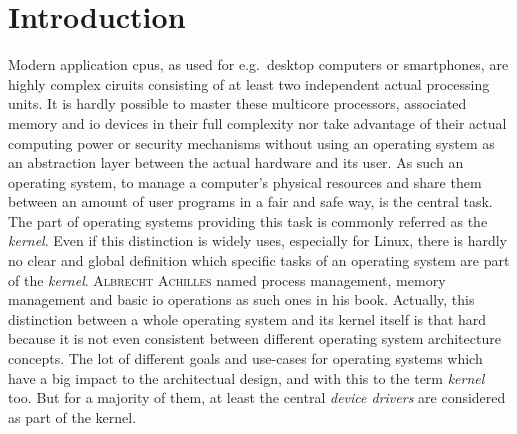 

\chapter{Introduction}\label{ch:introduction}



Modern application \acp{cpu}, as used for e.g.\ desktop computers or smartphones, are highly complex ciruits consisting of at least two independent actual processing units.
It is hardly possible to master these multicore processors, associated memory and \ac{io} devices in their full complexity nor take advantage of their actual computing power or security mechanisms without using an operating system as an abstraction layer between the actual hardware and its user.
As such an operating system, to manage a computer's physical resources and share them between an amount of user programs in a fair and safe way, is the central task.
The part of operating systems providing this task is commonly referred as the \textit{kernel}.  
Even if this distinction is widely uses, especially for Linux, there is hardly no clear and global definition which specific tasks of an operating system are part of the \textit{kernel}.
\textsc{Albrecht Achilles} named process management, memory management and basic \ac{io} operations as such ones in his book\cite{achilles2006betriebssysteme}.
Actually, this distinction between a whole operating system and its kernel itself is that hard because it is not even consistent between different operating system architecture concepts.
The lot of different goals and use-cases for operating systems which have a big impact to the architectual design, and with this to the term \textit{kernel} too. 
But for a majority of them, at least the central \textit{device drivers} are considered as part of the kernel. 

